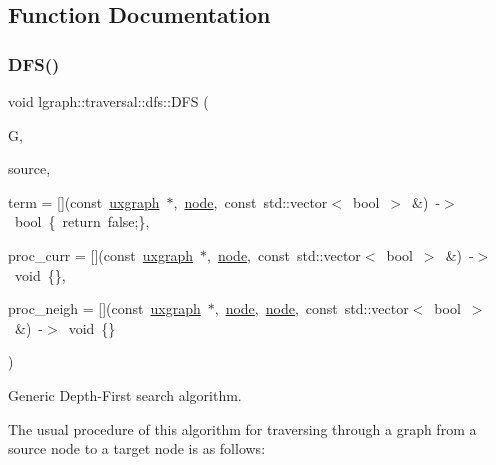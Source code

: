 \subsection{Function Documentation}
\mbox{\label{namespacelgraph_1_1traversal_1_1dfs_a42533f44875cda914e453cb6dd673600}} 
\subsubsection{\texorpdfstring{D\+F\+S()}{DFS()}}
{\footnotesize\ttfamily void lgraph\+::traversal\+::dfs\+::\+D\+FS (\begin{DoxyParamCaption}\item[{const \hyperlink{classlgraph_1_1uxgraph}{uxgraph} $\ast$}]{G,  }\item[{\hyperlink{namespacelgraph_a397169dd66adf725210a30fb7251773e}{node}}]{source,  }\item[{\hyperlink{namespacelgraph_1_1traversal_1_1dfs_a1c5d35982c40d91ec2f9f06d341b30f0}{dfs\+\_\+terminate}}]{term = {\ttfamily \mbox{[}\mbox{]}(const~\hyperlink{classlgraph_1_1uxgraph}{uxgraph}~$\ast$,~\hyperlink{namespacelgraph_a397169dd66adf725210a30fb7251773e}{node},~const~std\+:\+:vector$<$~bool~$>$~\&)~-\/$>$~bool~\{~return~false;\}},  }\item[{\hyperlink{namespacelgraph_1_1traversal_1_1dfs_a6e812ea9069ebb1e7e72776874825f0f}{dfs\+\_\+process\+\_\+current}}]{proc\+\_\+curr = {\ttfamily \mbox{[}\mbox{]}(const~\hyperlink{classlgraph_1_1uxgraph}{uxgraph}~$\ast$,~\hyperlink{namespacelgraph_a397169dd66adf725210a30fb7251773e}{node},~const~std\+:\+:vector$<$~bool~$>$~\&)~-\/$>$~void~\{\}},  }\item[{\hyperlink{namespacelgraph_1_1traversal_1_1dfs_ab56faeb9b70dd2449b91f404baf6a829}{dfs\+\_\+process\+\_\+neighbour}}]{proc\+\_\+neigh = {\ttfamily \mbox{[}\mbox{]}(const~\hyperlink{classlgraph_1_1uxgraph}{uxgraph}~$\ast$,~\hyperlink{namespacelgraph_a397169dd66adf725210a30fb7251773e}{node},~\hyperlink{namespacelgraph_a397169dd66adf725210a30fb7251773e}{node},~const~std\+:\+:vector$<$~bool~$>$~\&)~-\/$>$~void~\{\}} }\end{DoxyParamCaption})}



Generic Depth-\/\+First search algorithm. 

The usual procedure of this algorithm for traversing through a graph from a source node to a target node is as follows\+:


